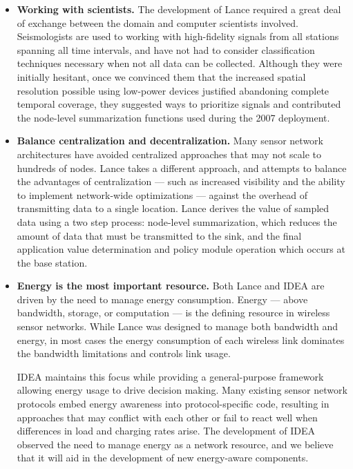 \begin{itemize}

\item \textbf{Working with scientists.} The development of Lance required a
great deal of exchange between the domain and computer scientists involved.
Seismologists are used to working with high-fidelity signals from all
stations spanning all time intervals, and have not had to consider
classification techniques necessary when not all data can be collected.
Although they were initially hesitant, once we convinced them that the
increased spatial resolution possible using low-power devices justified
abandoning complete temporal coverage, they suggested ways to prioritize
signals and contributed the node-level summarization functions used during
the 2007 deployment.

\item \textbf{Balance centralization and decentralization.} Many sensor
network architectures have avoided centralized approaches that may not scale
to hundreds of nodes. Lance takes a different approach, and attempts to
balance the advantages of centralization --- such as increased visibility and
the ability to implement network-wide optimizations --- against the overhead
of transmitting data to a single location. Lance derives the value of sampled
data using a two step process: node-level summarization, which reduces the
amount of data that must be transmitted to the sink, and the final
application value determination and policy module operation which occurs at
the base station.

\item \textbf{Energy is the most important resource.} Both Lance and IDEA are
driven by the need to manage energy consumption. Energy --- above bandwidth,
storage, or computation --- is the defining resource in wireless sensor
networks. While Lance was designed to manage both bandwidth and energy, in
most cases the energy consumption of each wireless link dominates the
bandwidth limitations and controls link usage.

\hspace{0.25in} IDEA maintains this focus while providing a general-purpose
framework allowing energy usage to drive decision making. Many existing
sensor network protocols embed energy awareness into protocol-specific code,
resulting in approaches that may conflict with each other or fail to react
well when differences in load and charging rates arise. The development of
IDEA observed the need to manage energy as a network resource, and we believe
that it will aid in the development of new energy-aware components.


\end{itemize}
